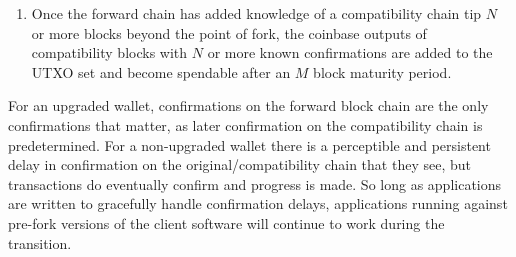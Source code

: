 \begin{enumerate}
\begin{enumerate}
      \item

        Once the forward chain has added knowledge of a compatibility
        chain tip $N$ or more blocks beyond the point of fork, the
        coinbase outputs of compatibility blocks with $N$ or more
        known confirmations are added to the UTXO set and become
        spendable after an $M$ block maturity period.

    \end{enumerate}

\end{enumerate}

For an upgraded wallet, confirmations on the forward block chain are
the only confirmations that matter, as later confirmation on the
compatibility chain is predetermined.  For a non-upgraded wallet there
is a perceptible and persistent delay in confirmation on the
original/compatibility chain that they see, but transactions do
eventually confirm and progress is made.  So long as applications are
written to gracefully handle confirmation delays, applications running
against pre-fork versions of the client software will continue to work
during the transition.
